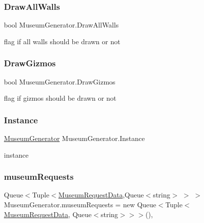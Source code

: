 \subsubsection{\texorpdfstring{Draw\+All\+Walls}{DrawAllWalls}}
{\footnotesize\ttfamily bool Museum\+Generator.\+Draw\+All\+Walls}



flag if all walls should be drawn or not 

\mbox{\label{class_museum_generator_a102f8361f66eb629d3ad5c9951616b42}} 
\subsubsection{\texorpdfstring{Draw\+Gizmos}{DrawGizmos}}
{\footnotesize\ttfamily bool Museum\+Generator.\+Draw\+Gizmos}



flag if gizmos should be drawn or not 

\mbox{\label{class_museum_generator_ab3655c1b58520b049e4ca4f80744180a}} 
\subsubsection{\texorpdfstring{Instance}{Instance}}
{\footnotesize\ttfamily \mbox{\hyperlink{class_museum_generator}{Museum\+Generator}} Museum\+Generator.\+Instance\hspace{0.3cm}{\ttfamily [static]}}



instance 

\mbox{\label{class_museum_generator_a10e2f6523a8d57b8265dab775c85b9f6}} 
\subsubsection{\texorpdfstring{museum\+Requests}{museumRequests}}
{\footnotesize\ttfamily Queue$<$Tuple$<$\mbox{\hyperlink{class_museum_request_data}{Museum\+Request\+Data}},Queue$<$string$>$ $>$ $>$ Museum\+Generator.\+museum\+Requests = new Queue$<$Tuple$<$\mbox{\hyperlink{class_museum_request_data}{Museum\+Request\+Data}}, Queue$<$string$>$$>$$>$()\hspace{0.3cm}{\ttfamily [static]}, {\ttfamily [private]}}



